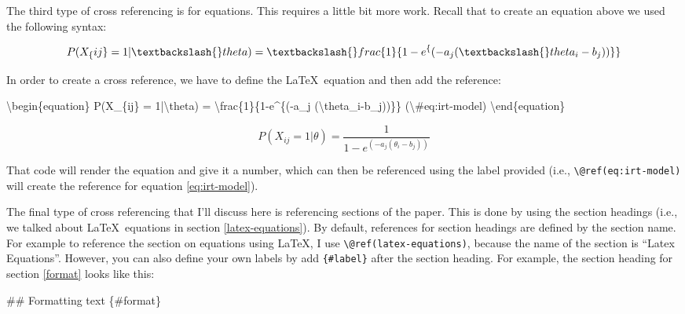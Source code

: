 \documentclass[12pt,english]{kuthesis}
\newenvironment{Shaded}{\begin{snugshade}}{\end{snugshade}}
\newcommand{\FunctionTok}[1]{\textcolor[rgb]{0.00,0.00,0.00}{#1}}
\newcommand{\NormalTok}[1]{#1}
\begin{document}
The third type of cross referencing is for equations. This requires a little bit more work. Recall that to create an equation above we used the following syntax:

\begin{Shaded}
\begin{Highlighting}[]
\NormalTok{$$}
\NormalTok{P(X_\{ij\} = 1|\textbackslash{}theta) = \textbackslash{}frac\{1\}\{1-e^\{(-a_j (\textbackslash{}theta_i-b_j))\}\}}
\NormalTok{$$}
\end{Highlighting}
\end{Shaded}

In order to create a cross reference, we have to define the \LaTeX~equation and then add the reference:

\begin{Shaded}
\begin{Highlighting}[]
\NormalTok{\textbackslash{}begin\{equation\}}
\NormalTok{  P(X_\{ij\} = 1|\textbackslash{}theta) = \textbackslash{}frac\{1\}\{1-e^\{(-a_j (\textbackslash{}theta_i-b_j))\}\}}
\NormalTok{  (\textbackslash{}#eq:irt-model)}
\NormalTok{\textbackslash{}end\{equation\}}
\end{Highlighting}
\end{Shaded}

\begin{equation}
  P(X_{ij} = 1|\theta) = \frac{1}{1-e^{(-a_j (\theta_i-b_j))}}
  \label{eq:irt-model}
\end{equation}

That code will render the equation and give it a number, which can then be referenced using the label provided (i.e., \texttt{\textbackslash{}@ref(eq:irt-model)} will create the reference for equation \eqref{eq:irt-model}).

The final type of cross referencing that I'll discuss here is referencing sections of the paper. This is done by using the section headings (i.e., we talked about \LaTeX~equations in section \ref{latex-equations}). By default, references for section headings are defined by the section name. For example to reference the section on equations using \LaTeX, I use \texttt{\textbackslash{}@ref(latex-equations)}, because the name of the section is ``Latex Equations''. However, you can also define your own labels by add \texttt{\{\#label\}} after the section heading. For example, the section heading for section \ref{format} looks like this:

\begin{Shaded}
\begin{Highlighting}[]
\FunctionTok{## Formatting text \{#format\}}
\end{Highlighting}
\end{Shaded}
\end{document}

